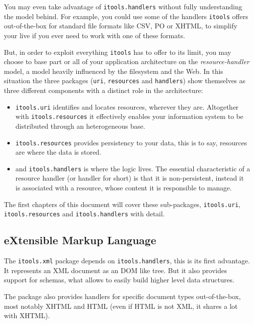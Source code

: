 You may even take advantage of {\tt itools.handlers} without fully
understanding the model behind. For example, you could use some of the
handlers {\tt itools} offers out-of-the-box for standard file formats
like CSV, PO or XHTML, to simplify your live if you ever need to work
with one of these formats.

But, in order to exploit everything {\tt itools} has to offer to its limit,
you may choose to base part or all of your application architecture on the
{\em resource-handler} model, a model heavily influenced by the filesystem
and the Web. In this situation the three packages ({\tt uri}, {\tt resources}
and {\tt handlers}) show themselves as three different components with
a distinct role in the architecture:

\begin{itemize}
  \item {\tt itools.uri} identifies and locates resources, wherever they
    are. Altogether with {\tt itools.resources} it effectively enables your
    information system to be distributed through an heterogeneous base.

  \item {\tt itools.resources} provides persistency to your data, this is
    to say, resources are where the data is stored.

  \item and {\tt itools.handlers} is where the logic lives. The essential
    characteristic of a resource handler (or handler for short) is that it is
    non-persistent, instead it is associated with a resource, whose content
    it is responsible to manage.
\end{itemize}

The first chapters of this document will cover these sub-packages,
{\tt itools.uri}, {\tt itools.resources} and {\tt itools.handlers} with
detail.

\subsection{eXtensible Markup Language}

The {\tt itools.xml} package depends on {\tt itools.handlers}, this is its
first advantage. It represents an XML document as an DOM like tree. But it
also provides support for schemas, what allows to easily build higher
level data structures.

The package also provides handlers for specific document types out-of-the-box,
most notably XHTML and HTML (even if HTML is not XML, it shares a lot with
XHTML).


